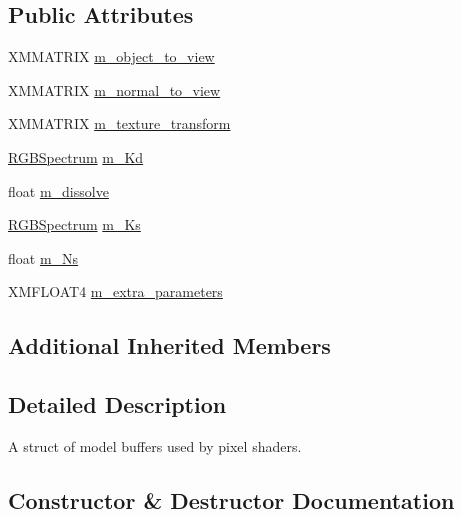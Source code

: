 \subsection*{Public Attributes}
\begin{DoxyCompactItemize}
\item 
X\+M\+M\+A\+T\+R\+IX \hyperlink{structmage_1_1_model_buffer_a2b4b94cd38c5d276aea4a7d6cc9edbba}{m\+\_\+object\+\_\+to\+\_\+view}
\item 
X\+M\+M\+A\+T\+R\+IX \hyperlink{structmage_1_1_model_buffer_ae9cfca57417c88d28362d979d6d37fa8}{m\+\_\+normal\+\_\+to\+\_\+view}
\item 
X\+M\+M\+A\+T\+R\+IX \hyperlink{structmage_1_1_model_buffer_a22d0996efc06c121ce2e0b88235d5650}{m\+\_\+texture\+\_\+transform}
\item 
\hyperlink{structmage_1_1_r_g_b_spectrum}{R\+G\+B\+Spectrum} \hyperlink{structmage_1_1_model_buffer_a3a0212d49721bc44c28f9ba1fbe38e1e}{m\+\_\+\+Kd}
\item 
float \hyperlink{structmage_1_1_model_buffer_a02ca2c0745b7687734c3c613a3d845cc}{m\+\_\+dissolve}
\item 
\hyperlink{structmage_1_1_r_g_b_spectrum}{R\+G\+B\+Spectrum} \hyperlink{structmage_1_1_model_buffer_a0f1c0dc40a4252b4a79bd2d9c30b3fca}{m\+\_\+\+Ks}
\item 
float \hyperlink{structmage_1_1_model_buffer_aae6440e415cbda57a8cc2f16e928934b}{m\+\_\+\+Ns}
\item 
X\+M\+F\+L\+O\+A\+T4 \hyperlink{structmage_1_1_model_buffer_a0daee7daeca6c86f029b8fa41c6d7866}{m\+\_\+extra\+\_\+parameters}
\end{DoxyCompactItemize}
\subsection*{Additional Inherited Members}


\subsection{Detailed Description}
A struct of model buffers used by pixel shaders. 

\subsection{Constructor \& Destructor Documentation}
\hypertarget{structmage_1_1_model_buffer_a9069cfb6d75067b7f1509332fbec9be0}{}\label{structmage_1_1_model_buffer_a9069cfb6d75067b7f1509332fbec9be0} 
